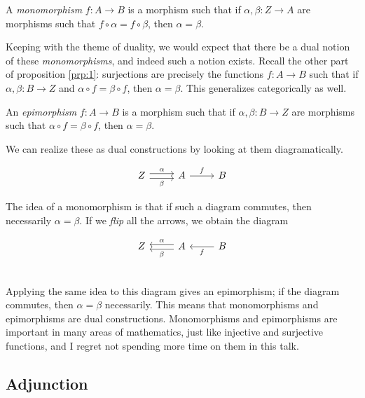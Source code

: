 \documentclass[11pt, letterpaper]{article}
\begin{document}
\begin{definition}[Monomorphism]\label{dfn:9}
	A \emph{monomorphism} $f : A \to B$ is a morphism such that if $\alpha ,\beta : Z \to A$ are morphisms such that $f\circ \alpha =f\circ \beta $, then $\alpha =\beta $.
\end{definition}

Keeping with the theme of duality, we would expect that there be a dual notion of these \emph{monomorphisms}, and indeed such a notion exists. Recall the other part of proposition \ref{prp:1}: surjections are precisely the functions $f : A \to B$ such that if $\alpha ,\beta : B \to Z$ and $\alpha \circ f=\beta \circ f$, then $\alpha =\beta $. This generalizes categorically as well.

\begin{definition}[Epimorphism]\label{dfn:10}
	An \emph{epimorphism} $f : A \to B$ is a morphism such that if $\alpha ,\beta : B \to Z$ are morphisms such that $\alpha \circ f=\beta \circ f$, then $\alpha =\beta $.
\end{definition}

We can realize these as dual constructions by looking at them diagramatically.\newpage
\begin{diagram}[ht]
	\[\begin{tikzcd}[row sep = 2.5em, column sep = 2.5em]
		Z\ar[r, "\alpha ", shift left]\ar[r, "\beta "', shift right]&A\ar[r, "f"]&B
	\end{tikzcd}\]
	\caption{Monomorphism}\label{dgm:7}
\end{diagram}
The idea of a monomorphism is that if such a diagram commutes, then necessarily $\alpha =\beta $. If we \emph{flip} all the arrows, we obtain the diagram
\begin{diagram}[ht]
	\[\begin{tikzcd}[row sep = 2.5em, column sep = 2.5em]
		Z&A\ar[l, shift left, "\beta "]\ar[l, shift right, "\alpha "']&B\ar[l, "f"]
	\end{tikzcd}\]
	\caption{Epimorphism}\label{dgm:8}
\end{diagram}\\
Applying the same idea to this diagram gives an epimorphism; if the diagram commutes, then $\alpha =\beta $ necessarily. This means that monomorphisms and epimorphisms are dual constructions. Monomorphisms and epimorphisms are important in many areas of mathematics, just like injective and surjective functions, and I regret not spending more time on them in this talk.

\subsection{Adjunction}
\end{document}
